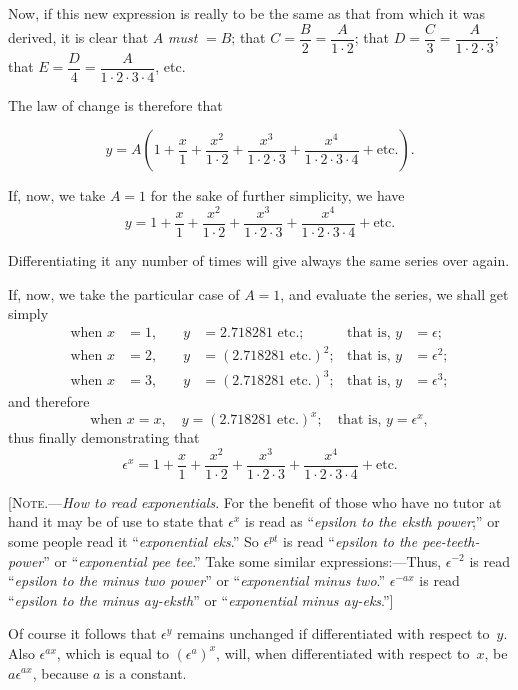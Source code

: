 \documentclass[12pt]{book}[2005/09/16]
\newcommand{\DPPageSep}[2]{\Pagelabel{#2}}
\newcommand{\Pagelabel}[1]
  {\phantomsection\label{#1}}
\newcommand{\Strut}{\rule{0pt}{16pt}}
\begin{document}
Now, if this new expression is really to be the same
as that from which it was derived, it is clear that
$A$ \emph{must} $=B$; that $C=\dfrac{B}{2}=\dfrac{A}{1· 2}$; that $D = \dfrac{C}{3} = \dfrac{A}{1 · 2 · 3}$;
that $E = \dfrac{D}{4} = \dfrac{A}{1 · 2 · 3 · 4}$, etc.

The law of change is therefore that\Strut
\[
y = A\left(1 + \dfrac{x}{1} + \dfrac{x^2}{1 · 2} + \dfrac{x^3}{1 · 2 · 3} + \dfrac{x^4}{1 · 2 · 3 · 4} + \text{etc}.\right).
\]

If, now, we take $A = 1$ for the sake of further
simplicity, we have
\[
y = 1 + \dfrac{x}{1} + \dfrac{x^2}{1 · 2} + \dfrac{x^3}{1 · 2 · 3} + \dfrac{x^4}{1 · 2 · 3 · 4} + \text{etc}.
\]

Differentiating it any number of times will give
always the same series over again.

If, now, we take the particular case of $A=1$, and
evaluate the series, we shall get simply
\begin{align*}
\text{when } x &= 1,\quad & y &= 2.718281 \text{ etc.};    & \text{that is, } y &= \epsilon;   \\
\text{when } x &= 2,\quad & y &=(2.718281 \text{ etc.})^2; & \text{that is, } y &= \epsilon^2; \\
\text{when } x &= 3,\quad & y &=(2.718281 \text{ etc.})^3; & \text{that is, } y &= \epsilon^3;
\end{align*}
\DPPageSep{157.png}{145}%
and therefore
\[
\text{when } x=x,\quad y=(2.718281 \text{ etc}.)^x;\quad\text{that is, } y=\epsilon^x,
\]
thus finally demonstrating that
\[
\epsilon^x = 1 + \dfrac{x}{1} + \dfrac{x^2}{1·2} + \dfrac{x^3}{1· 2· 3} + \dfrac{x^4}{1· 2· 3· 4} + \text{etc}.
\]

[\textsc{Note}.---\textit{How to read exponentials}. For the benefit
of those who have no tutor at hand it may be of use
to state that $\epsilon^x$ is read as ``\emph{epsilon to the eksth power};''
or some people read it ``\emph{exponential eks}.'' So $\epsilon^{pt}$ is
read ``\emph{epsilon to the pee-teeth-power}'' or ``\emph{exponential
pee tee}.'' Take some similar expressions:---Thus, $\epsilon^{-2}$ is
read ``\emph{epsilon to the minus two power}'' or ``\emph{exponential
minus two}.'' $\epsilon^{-ax}$ is read ``\emph{epsilon to the minus
ay-eksth}'' or ``\emph{exponential minus ay-eks}.'']

Of course it follows that $\epsilon^y$ remains unchanged if
differentiated with respect to~$y$. Also $\epsilon^{ax}$, which is
equal to $(\epsilon^a)^x$, will, when differentiated with respect
to~$x$, be $a\epsilon^{ax}$, because $a$ is a constant.
\end{document}
